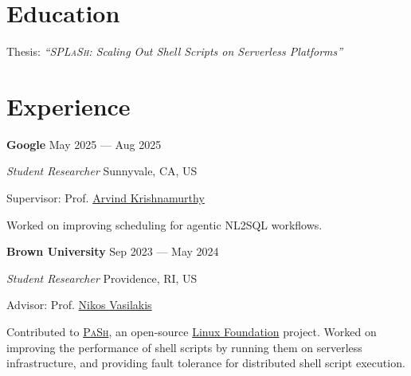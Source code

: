 \documentclass[margin,12pt]{resume}
\newcommand{\descriptionVSpace}{\vspace{0.5ex}\xspace}
\newcommand{\subsectionVSpace}{\vspace{3.5ex}\xspace}
\newcommand{\sectionVSpace}{\vspace{1ex}\xspace} %
\newcommand{\pash}{\textsc{PaSh}\xspace}
\newcommand{\sectionVSpaceCorrection}{\vspace{-3.5ex}} %
\newcommand{\splash}{\textsc{SPLaSh}\xspace}
\newcommand{\header}[1]{\textbf{#1}\xspace}
\newcommand{\company}[1]{\header{#1}\xspace}
\newcommand{\interval}[2]{#1 --- #2\xspace}
\newcommand{\place}[1]{#1\xspace}
\newcommand{\role}[1]{\textit{#1}\xspace}
\newcommand{\stitle}[1]{#1:\xspace}
\newcommand{\thesisTitle}[1]{\textit{``#1''}\xspace}
\newenvironment{rSubsection}{}{\par\subsectionVSpace}
\newenvironment{rSection}[1]{\sectionVSpaceCorrection\section{#1}\xspace}{\sectionVSpace\par}
\newenvironment{jobDuties}{\descriptionVSpace}{\par}
\begin{document}
\begin{resume}
\begin{rSection}{Education}
\begin{rSubsection}
            \begin{jobDuties}
                \stitle{Thesis} \thesisTitle{\splash: Scaling Out Shell Scripts on Serverless Platforms}
            \end{jobDuties}

        \end{rSubsection}
    \end{rSection}

    \begin{rSection}{Experience}
        \begin{rSubsection}
            \company{Google} \hfill \interval{May 2025}{Aug 2025}

            \role{Student Researcher} \hfill \place{Sunnyvale, CA, US}

            \stitle{Supervisor} Prof. \href{https://sites.google.com/cs.washington.edu/arvind}{Arvind Krishnamurthy}

            \begin{jobDuties}
                Worked on improving scheduling for agentic NL2SQL workflows.
            \end{jobDuties}
        \end{rSubsection}

        \begin{rSubsection}
            \company{Brown University} \hfill \interval{Sep 2023}{May 2024}

            \role{Student Researcher} \hfill \place{Providence, RI, US}

            \stitle{Advisor} Prof. \href{https://nikos.vasilak.is}{Nikos Vasilakis}

            \begin{jobDuties}
                Contributed to \href{https://binpa.sh}{\pash}, an open-source \href{https://www.linuxfoundation.org/press/press-release/linux-foundation-to-host-the-pash-project-accelerating-shell-scripting-with-automated-parallelization-for-industrial-use-cases}{Linux Foundation} project.
                Worked on improving the performance of shell scripts by running them on serverless infrastructure, and providing fault tolerance for distributed shell script execution.
            \end{jobDuties}
        \end{rSubsection}



\end{rSection}
\end{resume}
\end{document}
